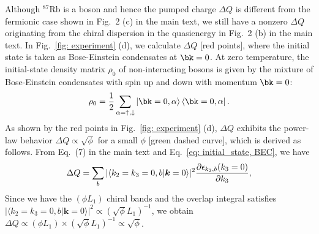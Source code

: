 \documentclass[
floatfix,
pra,
twocolumn,
reprint,
amsmath,amssymb,
aps,
footnote,
]{revtex4}
\begin{document}
Although ${}^{87}$Rb is a boson and hence the pumped charge $\Delta Q$ is different from the fermionic case shown in Fig.~2 (c) in the main text, %
we still have a nonzero $\Delta Q$ originating from the chiral dispersion in the quasienergy in Fig.~2 (b) in the main text.
In Fig.~\ref{fig: experiment} (d), we calculate $\Delta Q$ [red points], where the initial state is taken as Bose-Einstein condensates at $\bk=0$.
At zero temperature, the initial-state density matrix $\rho_0$ of non-interacting bosons is given by the mixture of Bose-Einstein condensates with spin up and down with momentum $\bk=0$:
\begin{align}
	\rho_0 = {1 \over 2}\sum_{\alpha = \uparrow, \downarrow}\ket{\bk=0,\alpha}\bra{\bk=0,\alpha}
	. \label{eq: initial_state, BEC}
\end{align}
As shown by the red points in Fig.~\ref{fig: experiment} (d), $\Delta Q$ exhibits the power-law behavior $\Delta Q \propto \sqrt{\phi}$ for a small $\phi$ [green dashed curve], which is derived as follows.
From Eq.~(7) in the main text and Eq.~\eqref{eq: initial_state, BEC}, we have
\begin{align}
	\Delta Q =
	\sum_{b}
	|\langle k_2 = k_3 = 0, b | \bm{k} = 0 \rangle |^2 {\partial \epsilon_{k_2, b}(k_3=0) \over \partial k_3}
	,
\end{align}
Since we have the $(\phi L_1)$ chiral bands and the overlap integral satisfies $|\langle k_2 = k_3 = 0, b | \bm{k} = 0 \rangle |^2 \propto (\sqrt{\phi}L_1)^{-1}$, we obtain $\Delta Q \propto (\phi L_1) \times (\sqrt{\phi}L_1)^{-1} \propto \sqrt{\phi}$.
\end{document}
